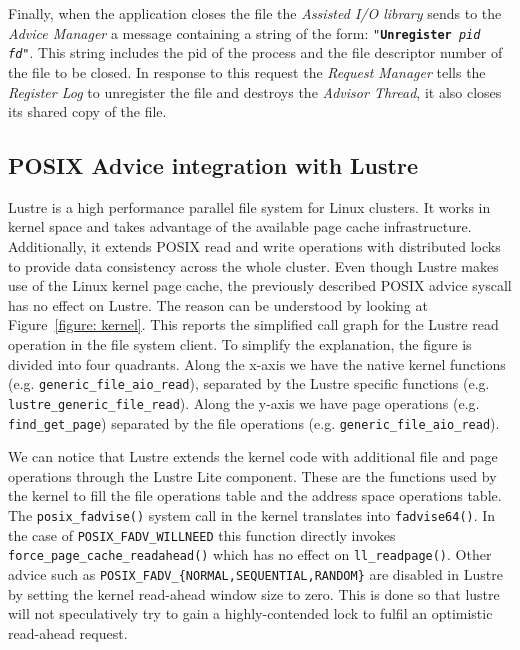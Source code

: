 Finally, when the application closes the file the \textit{Assisted I/O library} sends to the \textit{Advice Manager} a message containing a string of the form: \texttt{"\textbf{Unregister} \textit{pid} \textit{fd}"}. This string includes the pid of the process and the file descriptor number of the file to be closed. In response to this request the \textit{Request Manager} tells the \textit{Register Log} to unregister the file and destroys the \textit{Advisor Thread}, it also closes its shared copy of the file.

\subsection{POSIX Advice integration with Lustre}
\label{subsec: posix_advice_lustre}
Lustre is a high performance parallel file system for Linux clusters. It works in kernel space and takes advantage of the available page cache infrastructure. Additionally, it extends POSIX read and write operations with distributed locks to provide data consistency across the whole cluster. Even though Lustre makes use of the Linux kernel page cache, the previously described POSIX advice syscall has no effect on Lustre. The reason can be understood by looking at Figure~\ref{figure: kernel}. This reports the simplified call graph for the Lustre read operation in the file system client. To simplify the explanation, the figure is divided into four quadrants. Along the x-axis we have the native kernel functions (e.g. \texttt{generic\_file\_aio\_read}), separated by the Lustre specific functions (e.g. \texttt{lustre\_generic\_file\_read}). Along the y-axis we have page operations (e.g. \texttt{find\_get\_page}) separated by the file operations (e.g. \texttt{generic\_file\_aio\_read}). 

We can notice that Lustre extends the kernel code with additional file and page operations through the Lustre Lite component. These are the functions used by the kernel to fill the file operations table and the address space operations table. The \texttt{posix\_fadvise()} system call in the kernel translates into \texttt{fadvise64()}. In the case of \texttt{POSIX\_FADV\_WILLNEED} this function directly invokes \texttt{force\_page\_cache\_readahead()} which has no effect on \texttt{ll\_readpage()}. Other advice such as \texttt{POSIX\_FADV\_\{NORMAL,SEQUENTIAL,RANDOM\}} are disabled in Lustre by setting the kernel read-ahead window size to zero. This is done so that lustre will not speculatively try to gain a highly-contended lock to fulfil an optimistic read-ahead request.

